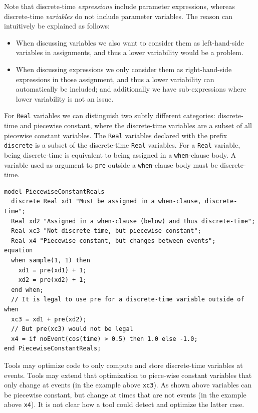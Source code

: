 \begin{nonnormative}
Note that discrete-time \emph{expressions} include parameter expressions, whereas discrete-time \emph{variables} do not include parameter variables.
The reason can intuitively be explained as follows:
\begin{itemize}
\item When discussing variables we also want to consider them as left-hand-side variables in assignments, and thus a lower variability would be a problem.
\item When discussing expressions we only consider them as right-hand-side expressions in those assignment, and thus a lower variability can automatically be included; and additionally we have sub-expressions where lower variability is not an issue.
\end{itemize}

For \lstinline!Real! variables we can distinguish two subtly different categories: discrete-time and piecewise constant, where the discrete-time variables are a subset of all piecewise constant variables.
The \lstinline!Real! variables declared with the prefix \lstinline!discrete! is a subset of the discrete-time \lstinline!Real! variables.
For a \lstinline!Real! variable, being discrete-time is equivalent to being assigned in a \lstinline!when!-clause body.
A variable used as argument to \lstinline!pre! outside a \lstinline!when!-clause body must be discrete-time.

\begin{lstlisting}[language=modelica]
model PiecewiseConstantReals
  discrete Real xd1 "Must be assigned in a when-clause, discrete-time";
  Real xd2 "Assigned in a when-clause (below) and thus discrete-time";
  Real xc3 "Not discrete-time, but piecewise constant";
  Real x4 "Piecewise constant, but changes between events";
equation
  when sample(1, 1) then
    xd1 = pre(xd1) + 1;
    xd2 = pre(xd2) + 1;
  end when;
  // It is legal to use pre for a discrete-time variable outside of when
  xc3 = xd1 + pre(xd2);
  // But pre(xc3) would not be legal
  x4 = if noEvent(cos(time) > 0.5) then 1.0 else -1.0;
end PiecewiseConstantReals;
\end{lstlisting}

Tools may optimize code to only compute and store discrete-time variables at events.
Tools may extend that optimization to piece-wise constant variables that only change at events (in the example above \lstinline!xc3!).
As shown above variables can be piecewise constant, but change at times that are not events (in the example above \lstinline!x4!).
It is not clear how a tool could detect and optimize the latter case.


\end{nonnormative}
